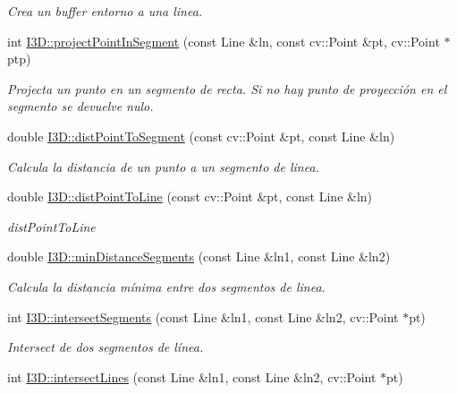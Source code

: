 \begin{DoxyCompactItemize}
\begin{DoxyCompactList}\small\item\em Crea un buffer entorno a una linea. \end{DoxyCompactList}\item 
int \hyperlink{group___geometric_entities_ga373cb249ff9ec768706e6299e466fcc3}{I3\+D\+::project\+Point\+In\+Segment} (const Line \&ln, const cv\+::\+Point \&pt, cv\+::\+Point $\ast$ptp)
\begin{DoxyCompactList}\small\item\em Projecta un punto en un segmento de recta. Si no hay punto de proyección en el segmento se devuelve nulo. \end{DoxyCompactList}\item 
double \hyperlink{group___geometric_entities_ga2c47087468458c7841306da1f626a42d}{I3\+D\+::dist\+Point\+To\+Segment} (const cv\+::\+Point \&pt, const Line \&ln)
\begin{DoxyCompactList}\small\item\em Calcula la distancia de un punto a un segmento de linea. \end{DoxyCompactList}\item 
double \hyperlink{group___geometric_entities_gaa655879a00ab3687d5a60674c3f2d730}{I3\+D\+::dist\+Point\+To\+Line} (const cv\+::\+Point \&pt, const Line \&ln)
\begin{DoxyCompactList}\small\item\em dist\+Point\+To\+Line \end{DoxyCompactList}\item 
double \hyperlink{group___geometric_entities_ga0f0852cb538b811ce51c1a3b448d9939}{I3\+D\+::min\+Distance\+Segments} (const Line \&ln1, const Line \&ln2)
\begin{DoxyCompactList}\small\item\em Calcula la distancia mínima entre dos segmentos de linea. \end{DoxyCompactList}\item 
int \hyperlink{group___geometric_entities_ga9ff1bbb70ad818d18cfb38a05af1a1d6}{I3\+D\+::intersect\+Segments} (const Line \&ln1, const Line \&ln2, cv\+::\+Point $\ast$pt)
\begin{DoxyCompactList}\small\item\em Intersect de dos segmentos de línea. \end{DoxyCompactList}\item 
int \hyperlink{group___geometric_entities_ga65f2cb15aae52d5a13f166481af56116}{I3\+D\+::intersect\+Lines} (const Line \&ln1, const Line \&ln2, cv\+::\+Point $\ast$pt)

\end{DoxyCompactItemize}
